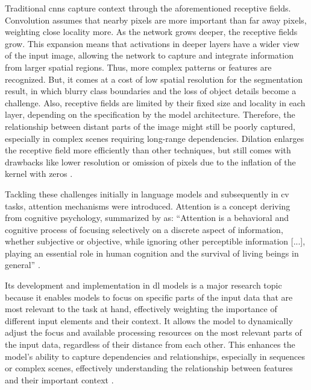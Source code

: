 Traditional \glspl{cnn} capture context through the aforementioned receptive fields. Convolution assumes that nearby pixels are more important than far away pixels, weighting close locality more. As the network grows deeper, the receptive fields grow. This expansion means that activations in deeper layers have a wider view of the input image, allowing the network to capture and integrate information from larger spatial regions. Thus, more complex patterns or features are recognized. But, it comes at a cost of low spatial resolution for the segmentation result, in which blurry class boundaries and the loss of object details become a challenge. Also, receptive fields are limited by their fixed size and locality in each layer, depending on the specification by the model architecture. Therefore, the relationship between distant parts of the image might still be poorly captured, especially in complex scenes requiring long-range dependencies. Dilation enlarges the receptive field more efficiently than other techniques, but still comes with drawbacks like lower resolution or omission of pixels due to the inflation of the kernel with zeros \autocite{deSantanaCorreia.Colombini2022,Cordonnier.Loukas.ea2020,Liu.Yu.ea2018,Luo.Li.ea2017,Ma.Liu.ea2019,Szeliski2022,Xie.Wang.ea2021}.

Tackling these challenges initially in language models and subsequently in \gls{cv} tasks, attention mechanisms were introduced. Attention is a concept deriving from cognitive psychology, summarized by \textcite{deSantanaCorreia.Colombini2022} as: \enquote{Attention is a behavioral and cognitive process of focusing selectively on a discrete aspect of information, whether subjective or objective, while ignoring other perceptible information [...], playing an essential role in human cognition and the survival of living beings in general} \autocite[6038]{deSantanaCorreia.Colombini2022}.

Its development and implementation in \gls{dl} models is a major research topic because it enables models to focus on specific parts of the input data that are most relevant to the task at hand, effectively weighting the importance of different input elements and their context. It allows the model to dynamically adjust the focus and available processing resources on the most relevant parts of the input data, regardless of their distance from each other. This enhances the model's ability to capture dependencies and relationships, especially in sequences or complex scenes, effectively understanding the relationship between features and their important context \autocite{Alhichri.Alswayed.ea2021,deSantanaCorreia.Colombini2022}.

